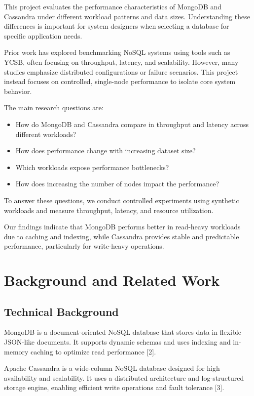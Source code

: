 \documentclass[12pt]{article}
\begin{document}
This project evaluates the performance characteristics of MongoDB and Cassandra under different workload patterns and data sizes. Understanding these differences is important for system designers when selecting a database for specific application needs.

Prior work has explored benchmarking NoSQL systems using tools such as YCSB, often focusing on throughput, latency, and scalability. However, many studies emphasize distributed configurations or failure scenarios. This project instead focuses on controlled, single-node performance to isolate core system behavior.

The main research questions are:

\begin{itemize}
\item How do MongoDB and Cassandra compare in throughput and latency across different workloads?
\item How does performance change with increasing dataset size?
\item Which workloads expose performance bottlenecks?
\item How does increasing the number of nodes impact the performance?
\end{itemize}

To answer these questions, we conduct controlled experiments using synthetic workloads and measure throughput, latency, and resource utilization.

Our findings indicate that MongoDB performs better in read-heavy workloads due to caching and indexing, while Cassandra provides stable and predictable performance, particularly for write-heavy operations.

\section{Background and Related Work}

\subsection{Technical Background}

MongoDB is a document-oriented NoSQL database that stores data in flexible JSON-like documents. It supports dynamic schemas and uses indexing and in-memory caching to optimize read performance [2].

Apache Cassandra is a wide-column NoSQL database designed for high availability and scalability. It uses a distributed architecture and log-structured storage engine, enabling efficient write operations and fault tolerance [3].
\end{document}
